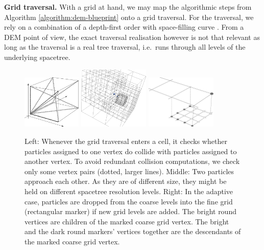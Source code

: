 {\bf Grid traversal.}
With a grid at hand, we may map the algorithmic steps from Algorithm
\ref{algorithm:dem-blueprint} onto a grid traversal.
For the traversal, we rely on a combination of a depth-first order with
space-filling curve \cite{Weinzierl:2009:Diss,Weinzierl:11:Peano}.
From a DEM point of view, the exact traversal realisation however is not that
relevant as long as the traversal is a real tree traversal, i.e.~runs through
all levels of the underlying spacetree.

\begin{figure}
  \begin{center}
    \includegraphics[width=0.25\textwidth]{sketches/collision-cube.pdf}
    \hspace{0.2cm}
    \includegraphics[width=0.3\textwidth]{experiments/two-bodies/visualisation/adaptive-grid01.png}
    \hspace{0.2cm}
    \includegraphics[width=0.3\textwidth]{sketches/multigrid.pdf}
  \end{center}
  \caption{
    Left: Whenever the grid traversal enters a cell, it checks whether particles
    assigned to one vertex do collide with particles assigned to another vertex.
    To avoid redundant collision computations, we check only some vertex pairs
    (dotted, larger lines).
    Middle: Two particles approach each other. As they are of different size,
    they might be held on different spacetree resolution levels.
    Right: In the adaptive case, particles are dropped from the coarse levels
    into the fine grid (rectangular marker) if new grid levels are added. The
    bright round vertices are children of the marked coarse grid vertex. The
    bright and the dark round markers' vertices together are the descendants of
    the marked coarse grid vertex.
  }
  \label{figure:collision-cube}
\end{figure}


